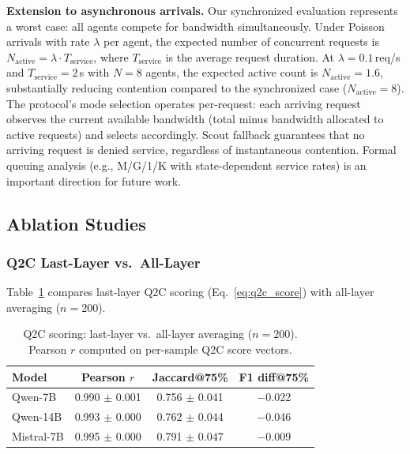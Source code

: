 \documentclass[journal]{IEEEtran}
\newcommand{\QtoC}{\textsc{Q2C}\xspace}
\begin{document}
\textbf{Extension to asynchronous arrivals.}
Our synchronized evaluation represents a worst case: all agents compete for bandwidth simultaneously.
Under Poisson arrivals with rate $\lambda$ per agent, the expected number of concurrent requests is $N_{\text{active}} = \lambda \cdot T_{\text{service}}$, where $T_{\text{service}}$ is the average request duration.
At $\lambda = 0.1$\,req/s and $T_{\text{service}} = 2$\,s with $N = 8$ agents, the expected active count is $N_{\text{active}} = 1.6$, substantially reducing contention compared to the synchronized case ($N_{\text{active}} = 8$).
The protocol's mode selection operates per-request: each arriving request observes the current available bandwidth (total minus bandwidth allocated to active requests) and selects accordingly.
Scout fallback guarantees that no arriving request is denied service, regardless of instantaneous contention.
Formal queuing analysis (e.g., M/G/1/K with state-dependent service rates) is an important direction for future work.

\subsection{Ablation Studies}
\label{sec:ablation}

\subsubsection{Q2C Last-Layer vs.\ All-Layer}

Table~\ref{tab:ablation_q2c} compares last-layer \QtoC scoring (Eq.~\ref{eq:q2c_score}) with all-layer averaging ($n = 200$).

\begin{table}[t]
\centering
\caption{Q2C scoring: last-layer vs.\ all-layer averaging ($n = 200$). Pearson $r$ computed on per-sample Q2C score vectors.}
\label{tab:ablation_q2c}
\small
\begin{tabular}{@{}lccc@{}}
\toprule
\textbf{Model} & \textbf{Pearson $r$} & \textbf{Jaccard@75\%} & \textbf{F1 diff@75\%} \\
\midrule
Qwen-7B    & 0.990 $\pm$ 0.001 & 0.756 $\pm$ 0.041 & $-$0.022 \\
Qwen-14B   & 0.993 $\pm$ 0.000 & 0.762 $\pm$ 0.044 & $-$0.046 \\
Mistral-7B & 0.995 $\pm$ 0.000 & 0.791 $\pm$ 0.047 & $-$0.009 \\
\bottomrule
\end{tabular}
\end{table}
\end{document}
